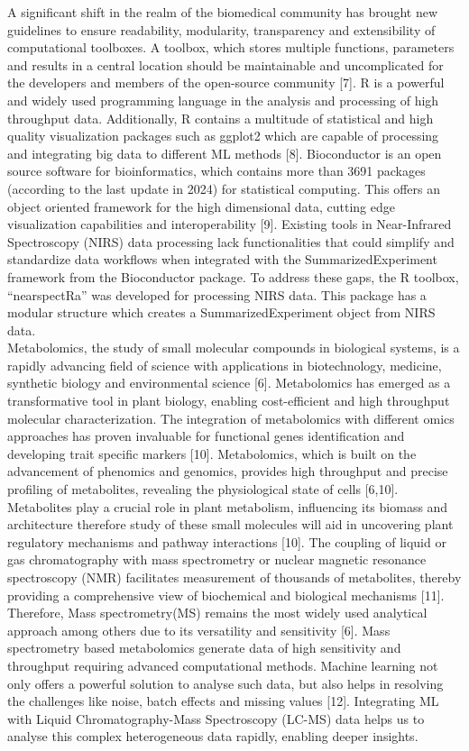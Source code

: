 \documentclass[12pt,a4paper]{report}
\begin{document}
A significant  shift in the realm of the biomedical community has brought new guidelines to ensure readability, modularity, transparency and extensibility of computational toolboxes. A toolbox, which stores multiple functions, parameters and results in a central location should be maintainable and uncomplicated for the developers and members of the open-source community [7].
R is a powerful and widely used programming language in the analysis and processing of high throughput data. Additionally, R contains a multitude of statistical and high quality visualization packages such as ggplot2 which are capable of processing and integrating big data to different ML methods [8]. Bioconductor is an open source software for bioinformatics, which contains more than 3691 packages (according to the last update in 2024) for statistical computing. 
This offers an object oriented framework for the high dimensional data, cutting edge visualization capabilities and interoperability [9]. Existing tools in Near-Infrared Spectroscopy (NIRS) data processing lack functionalities that could simplify and standardize data workflows when integrated with the SummarizedExperiment framework from the Bioconductor package. To address these gaps, the R toolbox, “nearspectRa” was developed for processing NIRS data.
This package has a modular structure which creates a SummarizedExperiment object from NIRS data. \\


Metabolomics, the study of small molecular compounds in biological systems, is a rapidly advancing field of science with applications in biotechnology, medicine, synthetic biology and environmental science [6]. Metabolomics has emerged as a transformative tool in plant biology, enabling cost-efficient and high throughput molecular characterization.
The integration of metabolomics with different omics approaches has proven invaluable for functional genes identification and developing trait specific markers [10]. Metabolomics, which is built on the advancement of phenomics and genomics, provides high throughput and precise profiling of metabolites, revealing the physiological state of cells [6,10].
Metabolites play a crucial role in plant metabolism, influencing its biomass and architecture therefore study of these small molecules will aid in uncovering plant regulatory mechanisms and pathway interactions [10].
The coupling of liquid or gas chromatography with mass spectrometry or nuclear magnetic resonance spectroscopy (NMR) facilitates measurement of thousands of metabolites, thereby providing a comprehensive view of biochemical and biological mechanisms [11]. Therefore, Mass spectrometry(MS) remains the most widely used analytical approach among others due to its versatility and sensitivity [6].
Mass spectrometry based metabolomics generate data of high sensitivity and throughput requiring advanced computational methods. Machine learning not only offers a powerful solution to analyse such data, but also helps in resolving the challenges like noise, batch effects and missing values [12]. Integrating ML with Liquid Chromatography-Mass Spectroscopy (LC-MS) data helps us to analyse this complex heterogeneous data rapidly, enabling deeper insights. \\
\end{document}
